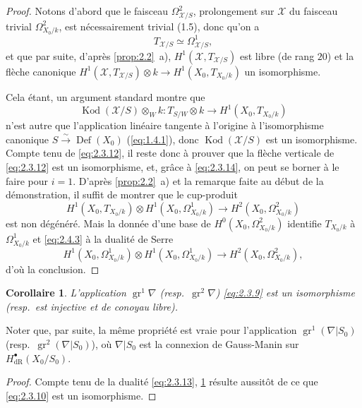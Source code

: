 \documentclass[12pt,a4paper]{article}
\theoremstyle{plain}
\newtheorem{corollary}[theorem]{Corollaire}
\theoremstyle{definition}
\theoremstyle{remark}
\DeclareMathOperator{\Def}{Def}
\DeclareMathOperator{\gr}{gr}
\DeclareMathOperator{\Kod}{Kod}
\begin{document}
\begin{proof}
Notons d'abord que le faisceau $\Omega^2_{\mathcal{X}/S}$, prolongement sur $\mathcal{X}$ du faisceau trivial $\Omega^2_{X_0/k}$, est nécessairement trivial (1.5), donc qu'on a
\begin{equation}\label{eq:2.4.1}
T_{\mathcal{X}/S} \simeq \Omega^1_{\mathcal{X}/S},
\end{equation}
et que par suite, d'après \ref{prop:2.2}~a), $H^1(\mathcal{X}, T_{\mathcal{X}/S})$ est libre (de rang $20$) et la flèche canonique $H^1(\mathcal{X}, T_{\mathcal{X}/S}) \otimes k \to H^1(X_0, T_{X_0/k})$ un isomorphisme.

Cela étant, un argument standard montre que
\begin{equation}\label{eq:2.4.2}
\Kod(\mathcal{X}/S) \otimes_W k: T_{S/W} \otimes k \to H^1(X_0, T_{X_0/k})
\end{equation}
n'est autre que l'application linéaire tangente à l'origine à l'isomorphisme canonique $S \xrightarrow{\sim} \Def(X_0)$ (\eqref{eq:1.4.1}), donc $\Kod(\mathcal{X}/S)$ est un isomorphisme. Compte tenu de \eqref{eq:2.3.12}, il reste donc à prouver que la flèche verticale de \eqref{eq:2.3.12} est un isomorphisme, et, grâce à \eqref{eq:2.3.14}, on peut se borner à le faire pour $i = 1$. D'après \ref{prop:2.2}~a) et la remarque faite au début de la démonstration, il suffit de montrer que le cup-produit
\begin{equation}\label{eq:2.4.3}
H^1(X_0, T_{X_0/k}) \otimes H^1(X_0, \Omega^1_{X_0/k}) \to H^2(X_0, \Omega^2_{X_0/k})
\end{equation}
est non dégénéré. Mais la donnée d'une base de $H^0(X_0, \Omega^2_{X_0/k})$ identifie $T_{X_0/k}$ à $\Omega^1_{X_0/k}$ et \eqref{eq:2.4.3} à la dualité de Serre
\[
H^1(X_0, \Omega^1_{X_0/k}) \otimes H^1(X_0, \Omega^1_{X_0/k}) \to H^2(X_0, \Omega^2_{X_0/k}),
\]
d'où la conclusion.
\end{proof}

\begin{corollary}\label{cor:2.4.4}
L'application $\gr^1 \nabla$ (resp.~$\gr^2 \nabla$) \eqref{eq:2.3.9} est un isomorphisme (resp.~est injective et de conoyau libre).
\end{corollary}

Noter que, par suite, la même propriété est vraie pour l'application $\gr^1(\nabla|S_0)$ (resp.~$\gr^2(\nabla|S_0)$), où $\nabla|S_0$ est la connexion de Gauss-Manin sur $H^{\bullet}_{\mathrm{dR}}(X_0/S_0)$.

\begin{proof}
Compte tenu de la dualité \eqref{eq:2.3.13}, \ref{cor:2.4.4} résulte aussitôt de ce que \eqref{eq:2.3.10} est un isomorphisme.
\end{proof}
\end{document}
